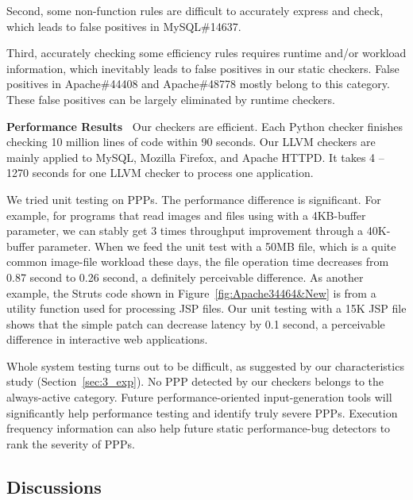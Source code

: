 Second, some non-function rules are difficult to 
accurately express and check, which leads to false positives in
MySQL\#14637.

Third, accurately checking some efficiency rules requires runtime and/or 
workload information, which inevitably leads to false positives in
our static checkers. 
False positives in Apache\#44408 and Apache\#48778 mostly belong to this 
category. These false positives can be largely eliminated by
runtime checkers.

{\bf Performance Results\ }
Our checkers are efficient. Each Python checker finishes
checking 10 million lines of code within 90 seconds.
Our LLVM checkers are mainly applied to 
MySQL, Mozilla Firefox, and Apache HTTPD.
It takes 4 -- 1270 seconds for one LLVM
checker to process one application.

We tried unit testing on PPPs.
The performance difference is significant. 
For example, for programs that read images and files using
 with a 4KB-buffer parameter,
we can stably get 3 times throughput improvement through a 40K-buffer parameter.
When we feed the unit test with a 50MB file, which is a quite common image-file
workload these days,
the file operation time decreases from 0.87 second to 0.26 second,
a definitely perceivable difference.
As another example, the Struts code shown in Figure~\ref{fig:Apache34464&New}
is from a utility function used for processing JSP files. 
Our unit testing with a 15K JSP 
file shows that the simple patch can decrease latency by 0.1 second, 
a perceivable difference in interactive web applications.

Whole system testing turns out to be difficult, as suggested by our
characteristics study (Section~\ref{sec:3_exp}). 
No PPP detected by our checkers belongs to the always-active category. 
Future performance-oriented input-generation tools will significantly
help performance testing and identify truly severe PPPs. Execution frequency
information can also help future static performance-bug detectors to rank 
the severity of PPPs.



\subsection{Discussions}

